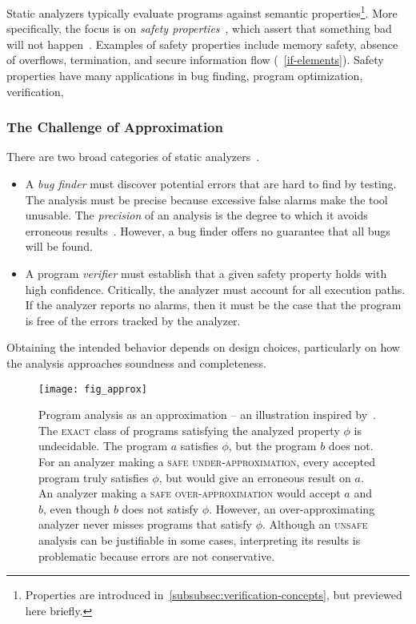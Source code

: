 Static analyzers typically evaluate programs against semantic properties\footnote{
Properties are introduced in~\autoref{subsubsec:verification-concepts}, but previewed here briefly.}.
More specifically, the focus is on \emph{safety properties}~\cite[p. 6]{moller2023},
which assert that something bad will not happen~\cite{lamport1977}.
Examples of safety properties include memory safety, absence of overflows, termination, and secure information flow (\cf~\autoref{if-elements}).
Safety properties have many applications in bug finding, program optimization, verification, \etc

\subsubsection{The Challenge of Approximation}\label{static-approx}

There are two broad categories of static analyzers~\cite{jourdan2015}.

\begin{itemize}

\item A \emph{bug finder} must discover potential errors that are hard to find by testing.
The analysis must be precise because excessive false alarms make the tool unusable.
The \emph{precision} of an analysis is the degree to which it avoids erroneous results~\cite{livshits2015}.
However, a bug finder offers no guarantee that all bugs will be found.

\item A program \emph{verifier} must establish that a given safety property holds with high confidence.
Critically, the analyzer must account for all execution paths.
If the analyzer reports no alarms, then it must be the case that the program is free of the errors tracked by the analyzer.

\end{itemize}

Obtaining the intended behavior depends on design choices, particularly on how the analysis approaches soundness and completeness.

\begin{figure}[t]
\centering
\texttt{[image: fig\_approx]}
\caption[Program analysis as an approximation]{
Program analysis as an approximation -- an illustration inspired by~\textcite{steffen2020}.
The \textsc{exact} class of programs satisfying the analyzed property \(\phi\) is undecidable.
The program \(a\) satisfies \(\phi\), but the program \(b\) does not.
For an analyzer making a \textsc{safe under-approximation}, every accepted program truly satisfies \(\phi\), but would give an erroneous result on \(a\).
An analyzer making a \textsc{safe over-approximation} would accept \(a\) and \(b\), even though \(b\) does not satisfy \(\phi\).
However, an over-approximating analyzer never misses programs that satisfy \(\phi\).
Although an \textsc{unsafe} analysis can be justifiable in some cases,
interpreting its results is problematic because errors are not conservative.
}\label{fig:approx}
\end{figure}

